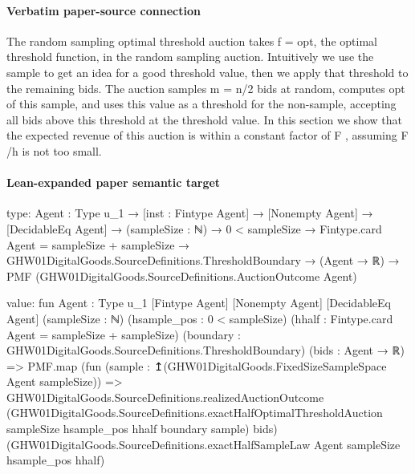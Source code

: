 \documentclass[10pt]{article}
\begin{document}
\paragraph{Verbatim paper-source connection}
\begin{ReviewVerbatim}
The random sampling optimal threshold auction
takes f = opt, the optimal threshold function, in
the random sampling auction. Intuitively we use the
sample to get an idea for a good threshold value,
then we apply that threshold to the remaining bids.
The auction samples m = n/2 bids at random, computes opt of this sample, and uses this value as a
threshold for the non-sample, accepting all bids above
this threshold at the threshold value. In this section
we show that the expected revenue of this auction is
within a constant factor of F , assuming F /h is not
too small.
\end{ReviewVerbatim}



\paragraph{Lean-expanded paper semantic target}
\begin{ReviewVerbatim}
type:
{Agent : Type u_1} →
  [inst : Fintype Agent] →
    [Nonempty Agent] →
      [DecidableEq Agent] →
        (sampleSize : ℕ) →
          0 < sampleSize →
            Fintype.card Agent = sampleSize + sampleSize →
              GHW01DigitalGoods.SourceDefinitions.ThresholdBoundary →
                (Agent → ℝ) → PMF (GHW01DigitalGoods.SourceDefinitions.AuctionOutcome Agent)

value:
fun {Agent : Type u_1} [Fintype Agent] [Nonempty Agent] [DecidableEq Agent] (sampleSize : ℕ)
    (hsample_pos : 0 < sampleSize) (hhalf : Fintype.card Agent = sampleSize + sampleSize)
    (boundary : GHW01DigitalGoods.SourceDefinitions.ThresholdBoundary) (bids : Agent → ℝ) =>
  PMF.map
    (fun (sample : ↥(GHW01DigitalGoods.FixedSizeSampleSpace Agent sampleSize)) =>
      GHW01DigitalGoods.SourceDefinitions.realizedAuctionOutcome
        (GHW01DigitalGoods.SourceDefinitions.exactHalfOptimalThresholdAuction sampleSize hsample_pos hhalf boundary
          sample)
        bids)
    (GHW01DigitalGoods.SourceDefinitions.exactHalfSampleLaw Agent sampleSize hsample_pos hhalf)
\end{ReviewVerbatim}
\end{document}
